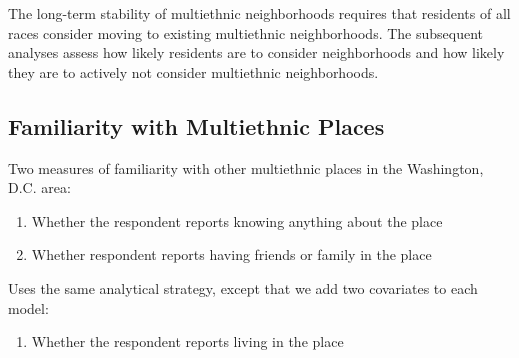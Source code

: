 \documentclass[]{article}
\providecommand{\tightlist}{%
  \setlength{\itemsep}{0pt}\setlength{\parskip}{0pt}}
\theoremstyle{definition}
\theoremstyle{definition}
\theoremstyle{definition}
\theoremstyle{remark}
\begin{document}
The long-term stability of multiethnic neighborhoods requires that
residents of all races consider moving to existing multiethnic
neighborhoods. The subsequent analyses assess how likely residents are
to consider neighborhoods and how likely they are to actively not
consider multiethnic neighborhoods.

\subsection{Familiarity with Multiethnic
Places}\label{familiarity-with-multiethnic-places}

Two measures of familiarity with other multiethnic places in the
Washington, D.C. area:

\begin{enumerate}
\def\labelenumi{\arabic{enumi}.}
\tightlist
\item
  Whether the respondent reports knowing anything about the place
\item
  Whether respondent reports having friends or family in the place
\end{enumerate}

Uses the same analytical strategy, except that we add two covariates to
each model:

\begin{enumerate}
\def\labelenumi{\arabic{enumi}.}
\tightlist
\item
  Whether the respondent reports living in the place
\end{enumerate}
\end{document}
